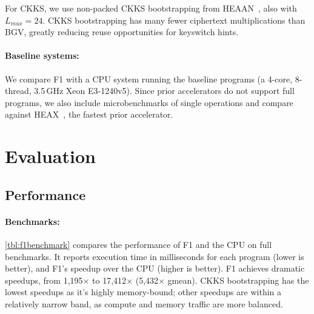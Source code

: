 
For CKKS, we use non-packed CKKS bootstrapping from HEA\-AN~\cite{cheon:eurocrypt2018:bootstrapping}, also with $L_{max} = 24$.
CKKS bootstrapping has many fewer ciphertext multiplications than BGV, greatly reducing
reuse opportunities for keyswitch hints.



\paragraph{Baseline systems:}
We compare F1 with a CPU system running the baseline programs (a 4-core, 8-thread, 3.5\,GHz Xeon E3-1240v5).
Since prior accelerators do not support full programs, we also include microbenchmarks of single operations
and compare against HEAX~\cite{riazi:asplos20:heax}, the fastest prior accelerator.

\section{Evaluation}\label{sec:evaluation}
\subsection{Performance}\label{sec:perf}

\addtocounter{table}{-2}
\tblFOneBenchmark
\addtocounter{table}{1}


\paragraph{Benchmarks:}
\autoref{tbl:f1benchmark} compares the performance of F1 and the CPU on full benchmarks.
It reports execution time in milliseconds for each program (lower is better), and F1's speedup over the CPU (higher is better).
F1 achieves dramatic speedups, from 1,195$\times$ to 17,412$\times$ (5,432$\times$ gmean).
CKKS bootstrapping has the lowest speedups as it's highly memory-bound;
other speedups are within a relatively narrow band, as compute and memory traffic are more balanced.

